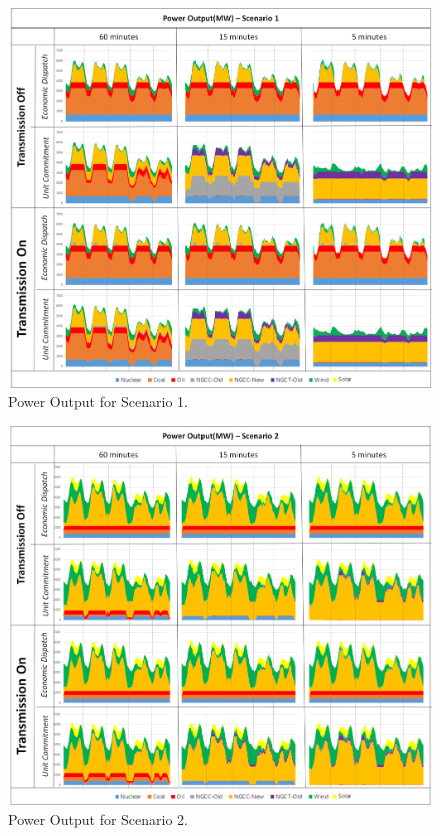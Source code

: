 \documentclass[12pt,LUDisStyle,twosided]{book}
\begin{document}
\begin{figure} 
  \centering
  
	  \includegraphics[width=\textwidth,height=\textheight,keepaspectratio]{PowerOutputScenario1.png}
  
  \caption{Power Output for Scenario 1.}
  \label{fig:powerOutputScenario1}
\end{figure}

\begin{figure} 
  \centering
  
	  \includegraphics[width=\textwidth,height=\textheight,keepaspectratio]{PowerOutputScenario2.png}
  
  \caption{Power Output for Scenario 2.}
  \label{fig:powerOutputScenario2}
\end{figure}
\end{document}
